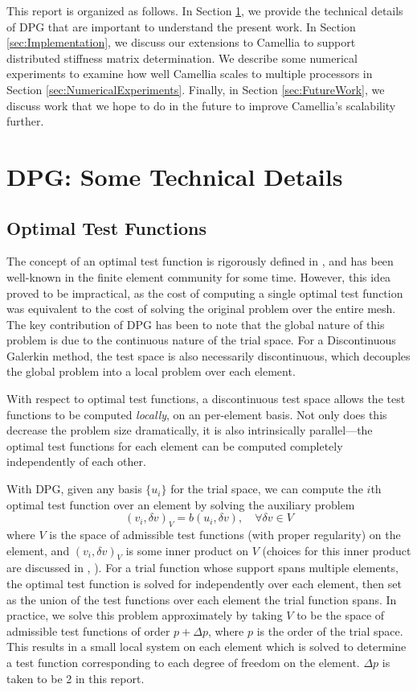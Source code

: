 \documentclass{article}
\begin{document}
This report is organized as follows.  In Section \ref{sec:DPGIntro}, we provide the technical details of DPG that are important to understand the present work.  In Section \ref{sec:Implementation}, we discuss our extensions to Camellia to support distributed stiffness matrix determination.  We describe some numerical experiments to examine how well Camellia scales to multiple processors in Section \ref{sec:NumericalExperiments}.  Finally, in Section \ref{sec:FutureWork}, we discuss work that we hope to do in the future to improve Camellia's scalability further.

\section{DPG: Some Technical Details}\label{sec:DPGIntro}
\subsection{Optimal Test Functions}

The concept of an optimal test function is rigorously defined in \cite{DPG2}, and has been well-known in the finite element community for some time. However, this idea proved to be impractical, as the cost of computing a single optimal test function was equivalent to the cost of solving the original problem over the entire mesh. The key contribution of DPG has been to note that the global nature of this problem is due to the continuous nature of the trial space. For a Discontinuous Galerkin method, the test space is also necessarily discontinuous, which decouples the global problem into a local problem over each element. 

With respect to optimal test functions, a discontinuous test space allows the test functions to be computed \emph{locally}, on an per-element basis. Not only does this decrease the problem size dramatically, it is also intrinsically parallel---the optimal test functions for each element can be computed completely independently of each other. 

With DPG, given any basis $\{u_i\}$ for the trial space, we can compute the $i$th optimal test function over an element by solving the auxiliary problem 
\[
(v_i, \delta v)_V = b(u_i,\delta v), \quad \forall \delta v\in V
\]
where $V$ is the space of admissible test functions (with proper regularity) on the element, and $(v_i,\delta v)_V$ is some inner product on $V$ (choices for this inner product are discussed in \cite{DPG2}, \cite{DPG4}). For a trial function whose support spans multiple elements, the optimal test function is solved for independently over each element, then set as the union of the test functions over each element the trial function spans. In practice, we solve this problem approximately by taking $V$ to be the space of admissible test functions of order $p+\Delta p$, where $p$ is the order of the trial space. This results in a small local system on each element which is solved to determine a test function corresponding to each degree of freedom on the element. $\Delta p$ is taken to be 2 in this report. 
\end{document}
